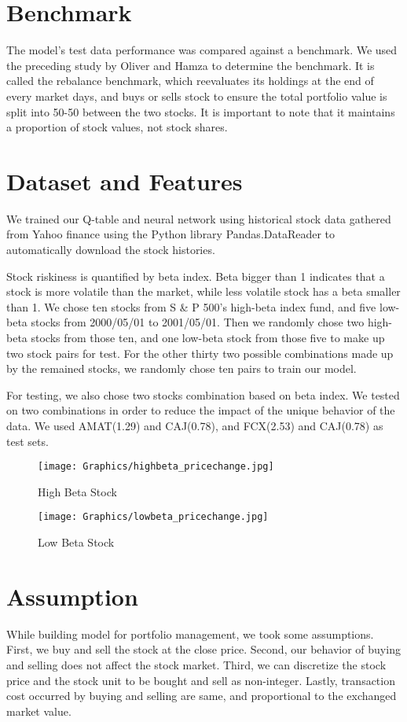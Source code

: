 \section{Benchmark}
The model’s test data performance was compared against a benchmark. We used the preceding study by Oliver and Hamza to determine the benchmark. It is called the rebalance benchmark, which reevaluates its holdings at the end of every market days, and buys or sells stock to ensure the total portfolio value is split into 50-50 between the two stocks. It is important to note that it maintains a proportion of stock values, not stock shares.

\section{Dataset and Features}
We trained our Q-table and neural network using historical stock data gathered from Yahoo finance using the Python library Pandas.DataReader to automatically download the stock histories. 

Stock riskiness is quantified by beta index. Beta bigger than 1 indicates that a stock is more volatile than the market, while less volatile stock has a beta smaller than 1. We chose ten stocks from S \& P 500’s high-beta index fund, and five low-beta stocks from 2000/05/01 to 2001/05/01. Then we randomly chose two high-beta stocks from those ten, and one low-beta stock from those five to make up two stock pairs for test. For the other thirty two possible combinations made up by the remained stocks, we randomly chose ten pairs to train our model. 

For testing, we also chose two stocks combination based on beta index. We tested on two combinations in order to reduce the impact of the unique behavior of the data. We used AMAT(1.29) and CAJ(0.78), and FCX(2.53) and CAJ(0.78) as test sets. 

\begin{figure}[h]
\begin{center}
\texttt{[image: Graphics/highbeta\_pricechange.jpg]} \caption{High Beta Stock}
\end{center}
\end{figure}

\begin{figure}[h]
\begin{center}
\texttt{[image: Graphics/lowbeta\_pricechange.jpg]} \caption{Low Beta Stock}
\end{center}
\end{figure}

\section{Assumption}
While building model for portfolio management, we took some assumptions. First, we buy and sell the stock at the close price. Second, our behavior of buying and selling does not affect the stock market. Third, we can discretize the stock price and the stock unit to be bought and sell as non-integer. Lastly, transaction cost occurred by buying and selling are same, and proportional to the exchanged market value.	

